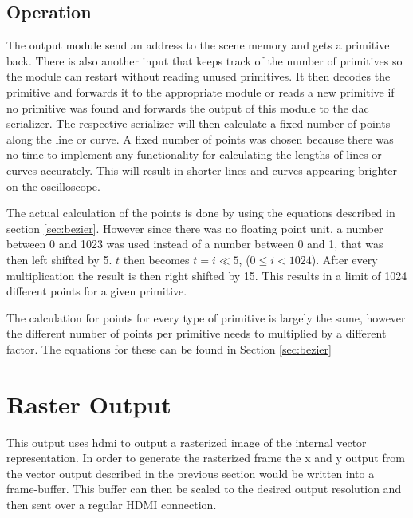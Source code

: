 \subsection{Operation}

The output module send an address to the scene memory and gets a primitive back.
There is also another input that keeps track of the number of primitives so the module can restart without reading unused primitives.
It then decodes the primitive and forwards it to the appropriate module or reads a new primitive if no primitive was found and forwards the output of this module to the \gls{dac} serializer.
The respective serializer will then calculate a fixed number of points along the line or curve.
A fixed number of points was chosen because there was no time to implement any functionality for calculating the lengths of lines or curves accurately.
This will result in shorter lines and curves appearing brighter on the oscilloscope.

The actual calculation of the points is done by using the equations described in section \ref{sec:bezier}.
However since there was no floating point unit, a number between 0 and 1023 was used instead of a number between 0 and 1, that was then left shifted by 5.
\(t\) then becomes \(t = i \ll 5\), (\(0 \leq i < 1024\)).
After every multiplication the result is then right shifted by 15.
This results in a limit of 1024 different points for a given primitive.

The calculation for points for every type of primitive is largely the same, however the different number of points per primitive needs to multiplied by a different factor.
The equations for these can be found in Section \ref{sec:bezier}

\section{Raster Output}

This output uses \gls{hdmi} to output a rasterized image of the internal vector representation.
In order to generate the rasterized frame the x and y output from the vector output described in the previous section would be written into a frame-buffer.
This buffer can then be scaled to the desired output resolution and then sent over a regular HDMI connection.
